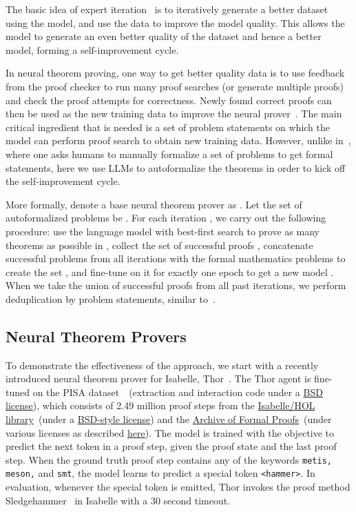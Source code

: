\documentclass{article}
\begin{document}
The basic idea of expert iteration~\citep{DBLP:conf/nips/AnthonyTB17} is to iteratively generate a better dataset using the model, and use the data to improve the model quality. This allows the model to generate an even better quality of the dataset and hence a better model, forming a self-improvement cycle. 

In neural theorem proving, one way to get better quality data is to use  feedback from the proof checker to run many proof searches (or generate multiple proofs) and check the proof attempts for correctness.
Newly found correct proofs can then be used as the new training data to improve the neural prover~\citep{bansal2019holist,polu2020gptf,fmscl}. 
The main critical ingredient that is needed is a set of problem statements on which the model can perform proof search to obtain new training data. However, unlike in~\citet{fmscl}, where one asks humans to manually formalize a set of problems to get formal statements, here we use LLMs to autoformalize the theorems in order to kick off the self-improvement cycle. 

More formally, denote a base neural theorem prover as . Let the set of autoformalized problems be . For each iteration , we carry out the following procedure: use the language model  with best-first search to prove as many theorems as possible in , collect the set of successful proofs , concatenate successful problems from all iterations with the formal mathematics problems to create the set , and fine-tune  on it for exactly one epoch to get a new model . When we take the union of successful proofs from all past iterations, we perform deduplication by problem statements, similar to~\citet{fmscl}.

\subsection{Neural Theorem Provers} 
\label{sec:ntp}
To demonstrate the effectiveness of the approach, we start with a recently introduced neural theorem prover for Isabelle, Thor~\citep{jiang2022thor}. The Thor agent is fine-tuned on the PISA dataset~\citep{jiang2021lisa}~(extraction and interaction code under a \href{https://github.com/albertqjiang/Portal-to-ISAbelle/blob/main/LICENSE}{BSD license}), which consists of 2.49 million proof steps from the \href{https://isabelle.in.tum.de/dist/library/HOL/index.html}{Isabelle/HOL library}~(under a \href{https://www.cl.cam.ac.uk/research/hvg/Isabelle/dist/Isabelle2021-1/COPYRIGHT}{BSD-style license}) and the \href{https://www.isa-afp.org}{Archive of Formal Proofs}~(under various licenses as described \href{https://www.isa-afp.org/about.html}{here}). The model is trained with the objective to predict the next token in a proof step, given the proof state and the last proof step. When the ground truth proof step contains any of the keywords \texttt{metis, meson,} and \texttt{smt}, the model learns to predict a special token \texttt{<hammer>}. In evaluation, whenever the special token is emitted, Thor invokes the proof method Sledgehammer~\citep{paulson2015three} in Isabelle with a 30 second timeout.
\end{document}

